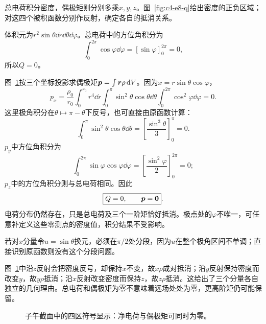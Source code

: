 \begin{solution}
总电荷积分密度，偶极矩则分别多乘$x,y,z$。图~\ref{fig:c4-e8-q}给出密度的正负区域；对这四个被积函数分别作反射，确定各自的抵消关系。


体积元为$r^2\sin\theta\dd r\dd\theta\dd\varphi$。总电荷中的方位角积分为
\[\int_0^{2\pi}\cos\varphi\dd\varphi=[\sin\varphi]_0^{2\pi}=0,\]
所以$Q=0$。

图~\ref{fig:c4-e8-s}按三个坐标投影求偶极矩$\bm{p}=\int\bm{r}\rho\mathop{}\!\mathrm d V$。因为$x=r\sin\theta\cos\varphi$，
\[p_x=\frac{\rho_0}{r_0}\int_0^{r_0}r^4\dd r
\int_0^\pi\sin^2\theta\cos\theta\dd\theta
\int_0^{2\pi}\cos^2\varphi\dd\varphi=0.
\]
这里极角积分在$\theta\mapsto\pi-\theta$下反号，也可直接由原函数计算：
\[\int_0^\pi\sin^2\theta\cos\theta\dd\theta
=\left[\frac{\sin^3\theta}{3}\right]_0^\pi=0.\]
$p_y$中方位角积分为
\[\int_0^{2\pi}\sin\varphi\cos\varphi\dd\varphi
=\left[\frac{\sin^2\varphi}{2}\right]_0^{2\pi}=0;\]
$p_z$中的方位角积分则与总电荷相同。因此
\[\boxed{Q=0,\qquad\bm{p}=\bm{0}}.\]
电荷分布仍然存在，只是总电荷及三个一阶矩恰好抵消。极点处的$\varphi$不唯一，可任意补定义这些零测点的密度值，积分结果不受影响。


若对$x$分量令$u=\sin\theta$换元，必须在$\pi/2$处分段，因为$u$在整个极角区间不单调；直接识别原函数则没有这个分段问题。

图~\ref{fig:c4-e8-s}中沿$z$反射会把密度反号，却保持$x$不变，故$x\rho$成对抵消；沿$y$反射保持密度而改变$y$，故$y\rho$抵消；沿$x$反射改变密度而保持$z$，故$z\rho$抵消。这给出了三个分量各自独立的几何理由。总电荷和偶极矩为零不意味着远场处处为零，更高阶矩仍可能保留。

\begin{figure}[H]\centering
{}
\caption{子午截面中的四区符号显示：净电荷与偶极矩可同时为零。}\label{fig:c4-e8-s}
\end{figure}


\end{solution}
